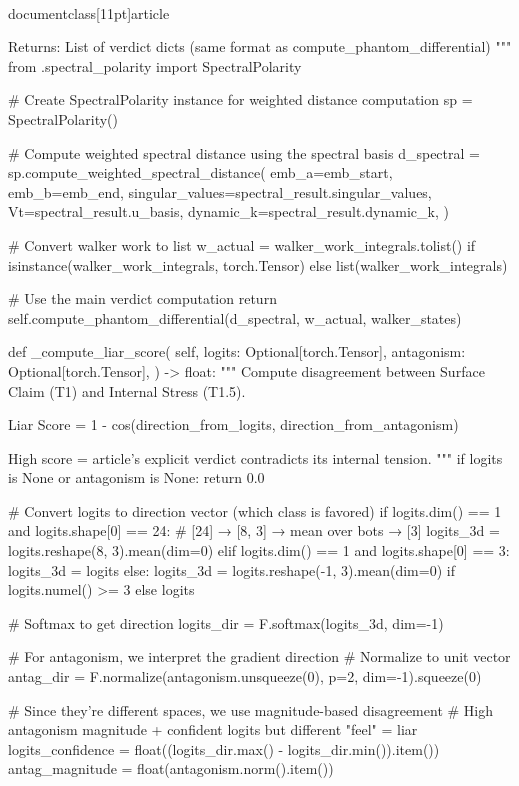 \\documentclass[11pt]{article}
\begin{document}
\begin{CodeBlock}
        Returns:
            List of verdict dicts (same format as compute_phantom_differential)
        """
        from .spectral_polarity import SpectralPolarity

        # Create SpectralPolarity instance for weighted distance computation
        sp = SpectralPolarity()

        # Compute weighted spectral distance using the spectral basis
        d_spectral = sp.compute_weighted_spectral_distance(
            emb_a=emb_start,
            emb_b=emb_end,
            singular_values=spectral_result.singular_values,
            Vt=spectral_result.u_basis,
            dynamic_k=spectral_result.dynamic_k,
        )

        # Convert walker work to list
        w_actual = walker_work_integrals.tolist() if isinstance(walker_work_integrals, torch.Tensor) else list(walker_work_integrals)

        # Use the main verdict computation
        return self.compute_phantom_differential(d_spectral, w_actual, walker_states)

    def _compute_liar_score(
        self,
        logits: Optional[torch.Tensor],
        antagonism: Optional[torch.Tensor],
    ) -> float:
        """
        Compute disagreement between Surface Claim (T1) and Internal Stress (T1.5).

        Liar Score = 1 - cos(direction_from_logits, direction_from_antagonism)

        High score = article's explicit verdict contradicts its internal tension.
        """
        if logits is None or antagonism is None:
            return 0.0

        # Convert logits to direction vector (which class is favored)
        if logits.dim() == 1 and logits.shape[0] == 24:
            # [24] → [8, 3] → mean over bots → [3]
            logits_3d = logits.reshape(8, 3).mean(dim=0)
        elif logits.dim() == 1 and logits.shape[0] == 3:
            logits_3d = logits
        else:
            logits_3d = logits.reshape(-1, 3).mean(dim=0) if logits.numel() >= 3 else logits

        # Softmax to get direction
        logits_dir = F.softmax(logits_3d, dim=-1)

        # For antagonism, we interpret the gradient direction
        # Normalize to unit vector
        antag_dir = F.normalize(antagonism.unsqueeze(0), p=2, dim=-1).squeeze(0)

        # Since they're different spaces, we use magnitude-based disagreement
        # High antagonism magnitude + confident logits but different "feel" = liar
        logits_confidence = float((logits_dir.max() - logits_dir.min()).item())
        antag_magnitude = float(antagonism.norm().item())


\end{CodeBlock}
\end{document}
